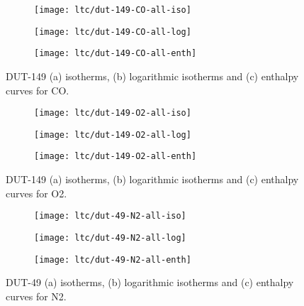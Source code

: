 \begin{figure}[htb]
    \centering
    \begin{subfigure}{0.33\linewidth}
        \texttt{[image: ltc/dut-149-CO-all-iso]}%
        \caption{}
    \end{subfigure}%
    \begin{subfigure}{0.33\linewidth}
        \texttt{[image: ltc/dut-149-CO-all-log]}%
        \caption{}
    \end{subfigure}%
    \begin{subfigure}{0.33\linewidth}
        \texttt{[image: ltc/dut-149-CO-all-enth]}%
        \caption{}
    \end{subfigure}%
    \caption{DUT-149 (a) isotherms, (b) logarithmic isotherms and 
    (c) enthalpy curves for CO.}%
    \label{appx:dut:fig:dut-149-CO-ltc}
\end{figure}

\begin{figure}[htb]
    \centering
    \begin{subfigure}{0.33\linewidth}
        \texttt{[image: ltc/dut-149-O2-all-iso]}%
        \caption{}
    \end{subfigure}%
    \begin{subfigure}{0.33\linewidth}
        \texttt{[image: ltc/dut-149-O2-all-log]}%
        \caption{}
    \end{subfigure}%
    \begin{subfigure}{0.33\linewidth}
        \texttt{[image: ltc/dut-149-O2-all-enth]}%
        \caption{}
    \end{subfigure}%
    \caption{DUT-149 (a) isotherms, (b) logarithmic isotherms and 
    (c) enthalpy curves for O2.}%
    \label{appx:dut:fig:dut-149-O2-ltc}
\end{figure}

\begin{figure}[htb]
    \centering
    \begin{subfigure}{0.33\linewidth}
        \texttt{[image: ltc/dut-49-N2-all-iso]}%
        \caption{}
    \end{subfigure}%
    \begin{subfigure}{0.33\linewidth}
        \texttt{[image: ltc/dut-49-N2-all-log]}%
        \caption{}
    \end{subfigure}%
    \begin{subfigure}{0.33\linewidth}
        \texttt{[image: ltc/dut-49-N2-all-enth]}%
        \caption{}
    \end{subfigure}%
    \caption{DUT-49 (a) isotherms, (b) logarithmic isotherms and 
    (c) enthalpy curves for N2.}%
    \label{appx:dut:fig:dut-49-N2-ltc}
\end{figure}

